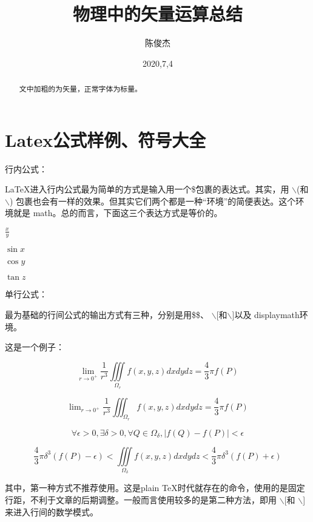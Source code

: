 \documentclass[UTF8]{ctexart}
\begin{document}
\title{物理中的矢量运算总结}

\author{陈俊杰}

\date{2020,7,4}

\maketitle

\begin{abstract}
  文中加粗的为矢量，正常字体为标量。
\end{abstract}

\section{Latex公式样例、符号大全}




{\Large 行内公式：}

LaTeX进入行内公式最为简单的方式是输入用一个\$包裹的表达式。其实，用  $\backslash$(和$\backslash$) 包裹也会有一样的效果。但其实它们两个都是一种“环境”的简便表达。这个环境就是 math。总的而言，下面这三个表达方式是等价的。

$\frac{x}{y}$

$\sin{x}$

\( \cos{y} \)

\begin{math}
\tan{z}
\end{math}


{\Large 单行公式：}

最为基础的行间公式的输出方式有三种，分别是用\$\$、 $\backslash$[和$\backslash$]以及 displaymath环境。

这是一个例子：


$$\lim\limits_{r\rightarrow{0^{+}}}{\frac{1}{r^{3}}\iiint\limits_{\Omega_{r}}f
(x,y,z)dxdydz =\frac{4}{3}\pi f(P)}
$$

$$\lim\nolimits_{r\rightarrow{0^{+}}}{\frac{1}{r^{3}}\iiint\nolimits_{\Omega_{r}}f
	(x,y,z)dxdydz =\frac{4}{3}\pi f(P)}
$$

\[
\forall \epsilon >0, \exists \delta >0, \forall Q \in\Omega_{\delta},\vert{f(Q)-f(P)}\vert<\epsilon
\]



\begin{displaymath}
\frac{4}{3}\pi \delta^{3} (f(P)-\epsilon) < \iiint\limits_{\Omega_{\delta}} f(x,y,z)dxdydz < \frac{4}{3}\pi \delta^{3}(f(P)+\epsilon)
\end{displaymath}


其中，第一种方式不推荐使用。这是plain TeX时代就存在的命令，使用的是固定行距，不利于文章的后期调整。一般而言使用较多的是第二种方法，即用 $\backslash$[和 $\backslash$]来进入行间的数学模式。
\end{document}
